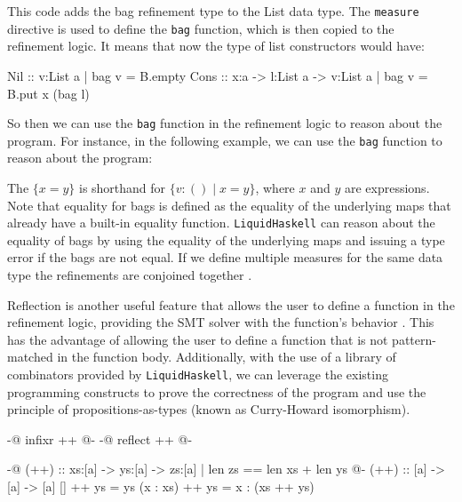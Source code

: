 \documentclass[]{rptuseminar}
\begin{document}
This code adds the bag refinement type to the List data type. The \texttt{measure} directive is used to define the \texttt{bag} function,
which is then copied to the refinement logic. It means that now the type of list constructors would have:

\begin{haskell}
Nil  :: {v:List a | bag v = B.empty}
Cons :: x:a -> l:List a -> {v:List a | bag v = B.put x (bag l)}
\end{haskell}

So then we can use the \texttt{bag} function in the refinement logic to reason about the program. 
For instance, in the following example, we can use the \texttt{bag} function to reason about the program:


The $\{x = y\}$ is shorthand for $\{ v : () \mid x = y \}$, where $x$ and $y$ are expressions.
Note that equality for bags is defined as the equality of the underlying maps that already have a built-in equality function.
\texttt{LiquidHaskell} can reason about the equality of bags by using the equality of the underlying maps and issuing a type error if the bags are not equal.
If we define multiple measures for the same data type the refinements are conjoined together \cite{niki_lecture_2024}.



Reflection is another useful feature that allows the user to define a function in the refinement logic, providing
the SMT solver with the function's behavior \cite{vazou_refinement_2018}. 
This has the advantage of allowing the user to define a function that is not pattern-matched in the function body.
Additionally, with the use of a library of combinators provided by \texttt{LiquidHaskell}, we can leverage the existing programming constructs to 
prove the correctness of the program and use the principle of propositions-as-types (known as Curry-Howard isomorphism)\cite{vazou_refinement_2018}\cite{wadler_propositions_2015}.

\begin{haskell}
{-@ infixr ++ @-}
{-@ reflect ++ @-}

{-@ (++) :: xs:[a] -> ys:[a] -> { zs:[a] | len zs == len xs + len ys } @-}
(++) :: [a] -> [a] -> [a]
[] ++ ys = ys
(x : xs) ++ ys = x : (xs ++ ys)
\end{haskell}
\end{document}
